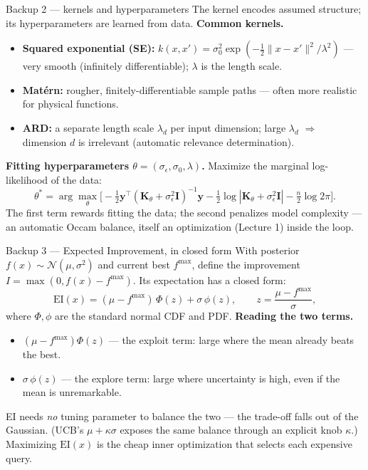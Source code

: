 \documentclass[10pt, aspectratio=169]{beamer}
\begin{document}
\begin{frame}{Backup 2 --- kernels and hyperparameters}
\footnotesize
The kernel encodes assumed structure; its hyperparameters are learned from data.
\medskip
\textbf{Common kernels.}
\begin{itemize}\setlength\itemsep{1pt}
\item \textbf{Squared exponential (SE):} $k(x,x')=\sigma_0^2\exp(-\tfrac{1}{2}\|x-x'\|^2/\lambda^2)$ --- very smooth (infinitely differentiable); $\lambda$ is the length scale.
\item \textbf{Mat\'ern:} rougher, finitely-differentiable sample paths --- often more realistic for physical functions.
\item \textbf{ARD:} a separate length scale $\lambda_d$ per input dimension; large $\lambda_d$ $\Rightarrow$ dimension $d$ is irrelevant (automatic relevance determination).
\end{itemize}
\medskip
\textbf{Fitting hyperparameters $\theta=(\sigma_\epsilon,\sigma_0,\lambda)$.} Maximize the marginal log-likelihood of the data:
\[
\theta^* = \arg\max_\theta\Big[-\tfrac12\mathbf{y}^\top(\mathbf{K}_\theta+\sigma_\epsilon^2\mathbf{I})^{-1}\mathbf{y} - \tfrac12\log|\mathbf{K}_\theta+\sigma_\epsilon^2\mathbf{I}| - \tfrac{n}{2}\log 2\pi\Big].
\]
The first term rewards fitting the data; the second penalizes model complexity --- an automatic Occam balance, itself an optimization (Lecture 1) inside the loop.
\end{frame}

\begin{frame}{Backup 3 --- Expected Improvement, in closed form}
\footnotesize
With posterior $f(x)\sim\mathcal{N}(\mu,\sigma^2)$ and current best $f^{\max}$, define the improvement $I = \max(0, f(x)-f^{\max})$. Its expectation has a closed form:
\[
\mathrm{EI}(x) = (\mu - f^{\max})\,\Phi(z) + \sigma\,\phi(z), \qquad z = \frac{\mu - f^{\max}}{\sigma},
\]
where $\Phi,\phi$ are the standard normal CDF and PDF.
\medskip
\textbf{Reading the two terms.}
\begin{itemize}\setlength\itemsep{1pt}
\item $(\mu-f^{\max})\Phi(z)$ --- the \alert{exploit} term: large where the mean already beats the best.
\item $\sigma\,\phi(z)$ --- the \alert{explore} term: large where uncertainty is high, even if the mean is unremarkable.
\end{itemize}
\medskip
EI needs \emph{no} tuning parameter to balance the two --- the trade-off falls out of the Gaussian. (UCB's $\mu+\kappa\sigma$ exposes the same balance through an explicit knob $\kappa$.) Maximizing $\mathrm{EI}(x)$ is the cheap inner optimization that selects each expensive query.
\end{frame}
\end{document}
